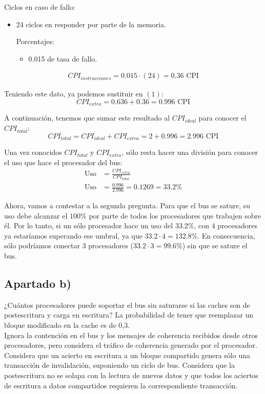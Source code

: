 \documentclass[12pt,a4paper]{article}
\begin{document}
Ciclos en caso de fallo:
\begin{itemize}
\item 24 ciclos en responder por parte de la memoria.

Porcentajes:
\begin{itemize}
\item 0.015 de tasa de fallo.
\end{itemize}
\end{itemize}
\begin{align*}
CPI_{instrucciones}=0.015\cdot (24)=0.36 \text{ CPI}
\end{align*}

Teniendo este dato, ya podemos sustituir en $(1)$:
\begin{equation*}
CPI_{extra}=0.636+0.36=0.996\text{ CPI}
\end{equation*}

A continuación, tenemos que sumar este resultado al $CPI_{ideal}$ para conocer el $CPI_{total}$:
\begin{equation*}
CPI_{total}=CPI_{ideal}+CPI_{extra}=2+0.996=2.996\text{ CPI}
\end{equation*}

Una vez conocidos $CPI_{total}$ y $CPI_{extra}$, sólo resta hacer una división para conocer el uso que hace el procesador del bus:
\begin{align*}
\text{Uso}&=\frac{CPI_{extra}}{CPI_{total}}\\
\text{Uso}&=\frac{0.996}{2.996} = 0.1269 = 33.2\%
\end{align*}

Ahora, vamos a contestar a la segunda pregunta. Para que el bus se sature, su uso debe alcanzar el $100\%$ por parte de todos los procesadores que trabajen sobre él. Por lo tanto, si un sólo procesador hace un uso del $33.2\%$, con 4 procesadores ya estaríamos superando ese umbral, ya que $33.2\cdot 4=132.8\%$. En consecuencia, sólo podríamos conectar 3 procesadores ($33.2\cdot 3=99.6\%$) sin que se sature el bus. 

\subsection{Apartado b)}
¿Cuántos procesadores puede soportar el bus sin saturarse si las caches son de postescritura y carga en escritura? La probabilidad de tener que reemplazar un bloque modificado en la cache es de 0,3. \\

Ignora la contención en el bus y los mensajes de coherencia recibidos desde otros procesadores, pero considera el tráfico de coherencia generado por el procesador. Considera que un acierto en escritura a un bloque compartido genera sólo una transacción de invalidación, suponiendo un ciclo de bus. Considera que la postescritura no se solapa con la lectura de nuevos datos y que todos los aciertos de escritura a datos compartidos requieren la correspondiente transacción.
\end{document}
